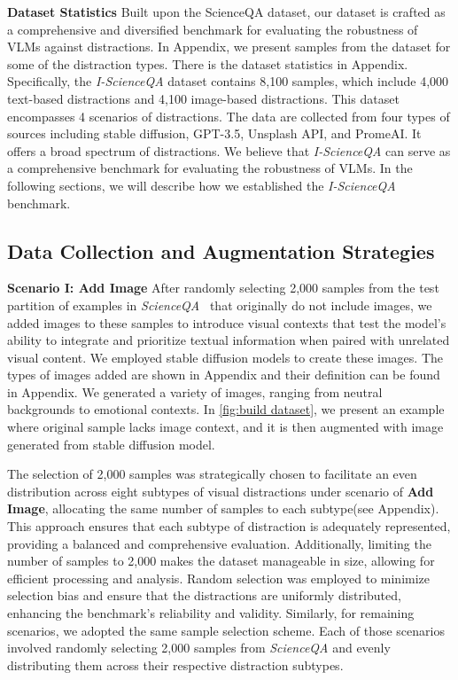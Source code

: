 \textbf{Dataset Statistics} Built upon the ScienceQA dataset, our dataset is crafted as a comprehensive and diversified benchmark for evaluating the robustness of VLMs against distractions. In Appendix, we present samples from the dataset for some of the distraction types. There is the dataset statistics in Appendix. Specifically, the \emph{I-ScienceQA} dataset contains 8,100 samples, which include 4,000 text-based distractions and 4,100 image-based distractions. This dataset encompasses 4 scenarios of distractions. The data are collected from four types of sources including stable diffusion\citep{Rombach2021HighResolutionIS}, GPT-3.5, Unsplash API\citep{unsplashapi}, and PromeAI\citep{promeai2024}. It offers a broad spectrum of distractions. We believe that \emph{I-ScienceQA} can serve as a comprehensive benchmark for evaluating the robustness of VLMs. In the following sections, we will describe how we established the \emph{I-ScienceQA} benchmark.



\subsection{Data Collection and Augmentation Strategies}

\textbf{Scenario I: Add Image} After randomly selecting 2,000 samples from the test partition of examples in \emph{ScienceQA}~\citep{lu2022scienceqa} that originally do not include images, we added images to these samples to introduce visual contexts that test the model's ability to integrate and prioritize textual information when paired with unrelated visual content. We employed stable diffusion models to create these images. The types of images added are shown in Appendix and their definition can be found in Appendix. We generated a variety of images, ranging from neutral backgrounds to emotional contexts. In \autoref{fig:build dataset}, we present an example where original sample lacks image context, and it is then augmented with image generated from stable diffusion model. 

The selection of 2,000 samples was strategically chosen to facilitate an even distribution across eight subtypes of visual distractions under scenario of \textbf{Add Image}, allocating the same number of samples to each subtype(see Appendix). This approach ensures that each subtype of distraction is adequately represented, providing a balanced and comprehensive evaluation. Additionally, limiting the number of samples to 2,000 makes the dataset manageable in size, allowing for efficient processing and analysis. Random selection was employed to minimize selection bias and ensure that the distractions are uniformly distributed, enhancing the benchmark's reliability and validity. Similarly, for remaining scenarios, we adopted the same sample selection scheme. Each of those scenarios involved randomly selecting 2,000 samples from \emph{ScienceQA} and evenly distributing them across their respective distraction subtypes. 


